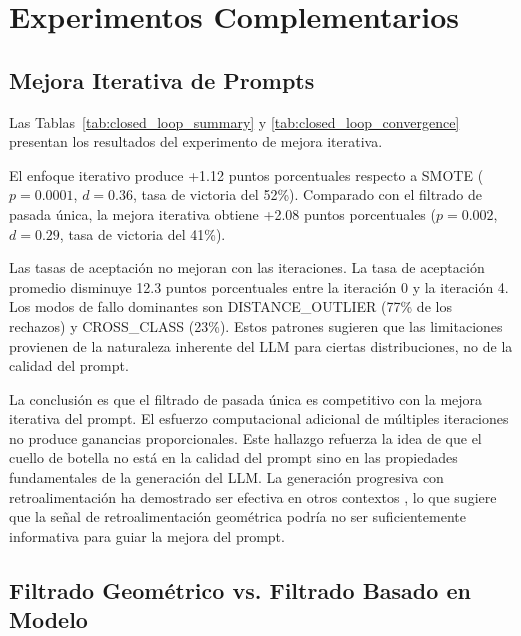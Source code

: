 
\chapter{Experimentos Complementarios}
\label{ch:appendix_complementarios}

\section{Mejora Iterativa de Prompts}
\label{sec:mejora_iterativa}

Las Tablas~\ref{tab:closed_loop_summary} y \ref{tab:closed_loop_convergence} presentan los resultados del experimento de mejora iterativa.



El enfoque iterativo produce +1.12 puntos porcentuales respecto a SMOTE ($p = 0.0001$, $d = 0.36$, tasa de victoria del 52\%). Comparado con el filtrado de pasada única, la mejora iterativa obtiene +2.08 puntos porcentuales ($p = 0.002$, $d = 0.29$, tasa de victoria del 41\%).



Las tasas de aceptación no mejoran con las iteraciones. La tasa de aceptación promedio disminuye 12.3 puntos porcentuales entre la iteración 0 y la iteración 4. Los modos de fallo dominantes son DISTANCE\_OUTLIER (77\% de los rechazos) y CROSS\_CLASS (23\%). Estos patrones sugieren que las limitaciones provienen de la naturaleza inherente del LLM para ciertas distribuciones, no de la calidad del prompt.

La conclusión es que el filtrado de pasada única es competitivo con la mejora iterativa del prompt. El esfuerzo computacional adicional de múltiples iteraciones no produce ganancias proporcionales. Este hallazgo refuerza la idea de que el cuello de botella no está en la calidad del prompt sino en las propiedades fundamentales de la generación del LLM. La generación progresiva con retroalimentación ha demostrado ser efectiva en otros contextos \cite{ye2022progen}, lo que sugiere que la señal de retroalimentación geométrica podría no ser suficientemente informativa para guiar la mejora del prompt.

\section{Filtrado Geométrico vs. Filtrado Basado en Modelo}
\label{sec:teacher_comparison}

